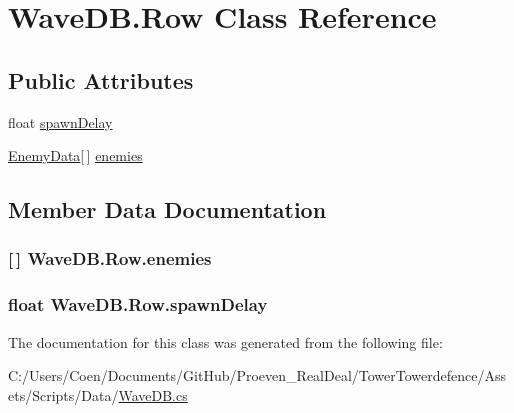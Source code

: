 \hypertarget{class_wave_d_b_1_1_row}{}\section{Wave\+D\+B.\+Row Class Reference}
\label{class_wave_d_b_1_1_row}
\subsection*{Public Attributes}
\begin{DoxyCompactItemize}
\item 
float \hyperlink{class_wave_d_b_1_1_row_a0c5369b7cbe9dd4cc4989071c70add3e}{spawn\+Delay}
\item 
\hyperlink{class_wave_d_b_1_1_enemy_data}{Enemy\+Data}\mbox{[}$\,$\mbox{]} \hyperlink{class_wave_d_b_1_1_row_abca0bcfd458ff664c03fc0ba6545e655}{enemies}
\end{DoxyCompactItemize}


\subsection{Member Data Documentation}
\subsubsection[{\texorpdfstring{enemies}{enemies}}]{ \mbox{[}$\,$\mbox{]} Wave\+D\+B.\+Row.\+enemies}\hypertarget{class_wave_d_b_1_1_row_abca0bcfd458ff664c03fc0ba6545e655}{}\label{class_wave_d_b_1_1_row_abca0bcfd458ff664c03fc0ba6545e655}
\subsubsection[{\texorpdfstring{spawn\+Delay}{spawnDelay}}]{\setlength{\rightskip}{0pt plus 5cm}float Wave\+D\+B.\+Row.\+spawn\+Delay}\hypertarget{class_wave_d_b_1_1_row_a0c5369b7cbe9dd4cc4989071c70add3e}{}\label{class_wave_d_b_1_1_row_a0c5369b7cbe9dd4cc4989071c70add3e}


The documentation for this class was generated from the following file\+:\begin{DoxyCompactItemize}
\item 
C\+:/\+Users/\+Coen/\+Documents/\+Git\+Hub/\+Proeven\+\_\+\+Real\+Deal/\+Tower\+Towerdefence/\+Assets/\+Scripts/\+Data/\hyperlink{_wave_d_b_8cs}{Wave\+D\+B.\+cs}\end{DoxyCompactItemize}
